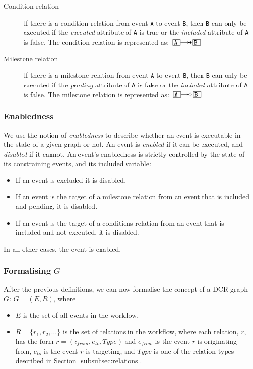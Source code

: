\documentclass{article}
\begin{document}
\begin{description}
				\begin{description}
					\item[Condition relation] If there is a condition relation from event \texttt{A} to event \texttt{B}, then \texttt{B} can only be executed if the \textit{executed} attribute of \texttt{A} is true or the \textit{included} attribute of \texttt{A} is false.
				The condition relation is represented as: $\ev{A} \crel \ev{B}$
					\item[Milestone relation] If there is a milestone relation from event \texttt{A} to event \texttt{B}, then \texttt{B} can only be executed if the \textit{pending} attribute of \texttt{A} is false or the \textit{included} attribute of \texttt{A} is false.
				The milestone relation is represented as: $\ev{A} \mrel \ev{B}$
				\end{description}
			\end{description}

			\subsubsection{Enabledness}

			We use the notion of \textit{enabledness} to describe whether an event is executable in the state of a given graph or not.
			An event is \textit{enabled} if it can be executed, and \textit{disabled} if it cannot.
			An event's enabledness is strictly controlled by the state of its constraining events, and its included variable:
			\begin{itemize}
				\item If an event is excluded it is disabled.
				\item If an event is the target of a milestone relation from an event that is included and pending, it is disabled.
				\item If an event is the target of a conditions relation from an event that is included and not executed, it is disabled.
			\end{itemize}
			In all other cases, the event is enabled.

			\subsubsection{Formalising \texorpdfstring{$G$}{}}
			\label{subsubsec:formalising-g}

			After the previous definitions, we can now formalise the concept of a DCR graph $G$:
			$G = (E,R)$, where
			\begin{itemize}
				\item $E$ is the set of all events in the workflow,
				\item $R = \{r_1, r_2, \dots\}$ is the set of relations in the workflow, where each relation, $r$, has the form $r=(e_{from}, e_{to}, Type)$ and $e_{from}$ is the event $r$ is originating from, $e_{to}$ is the event $r$ is targeting, and $Type$ is one of the relation types described in Section~\ref{subsubsec:relations}.
			\end{itemize}
\end{document}
